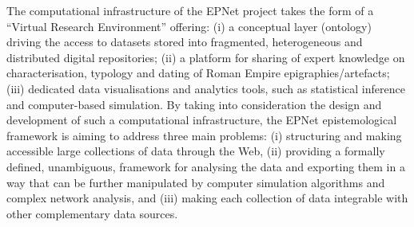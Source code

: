 \documentclass[a4paper]{article}
\begin{document}
The computational infrastructure of the EPNet project takes the form of a ``Virtual Research Environment'' offering: (i) a conceptual layer (ontology) driving the access to datasets stored into fragmented, heterogeneous and distributed digital repositories; (ii) a platform for sharing of expert knowledge on characterisation, typology and dating of Roman Empire epigraphies/artefacts; (iii) dedicated data visualisations and analytics tools, such as statistical inference and computer-based simulation. By taking into consideration the design and development of such a computational infrastructure, the EPNet epistemological framework is aiming to address three main problems: (i) structuring and making accessible large collections of data through the Web, (ii) providing a formally defined, unambiguous, framework for analysing the data and exporting them in a way that can be further manipulated by computer simulation algorithms and complex network analysis, and (iii) making each collection of data integrable with other complementary data sources.
\end{document}
